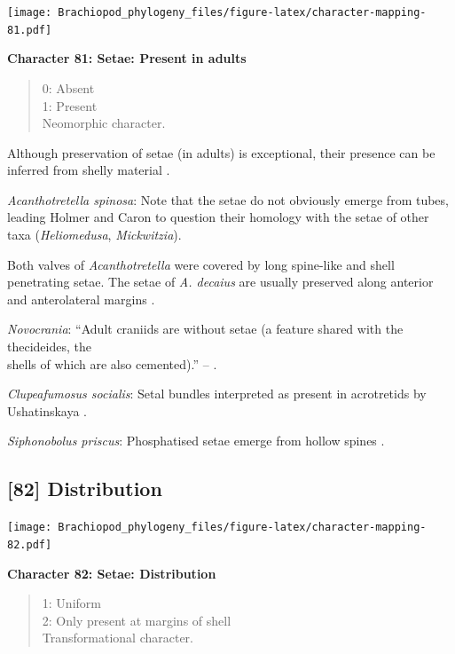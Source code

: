 \documentclass[]{book}
\theoremstyle{definition}
\theoremstyle{definition}
\theoremstyle{definition}
\theoremstyle{remark}
\begin{document}
\texttt{[image: Brachiopod\_phylogeny\_files/figure-latex/character-mapping-81.pdf]}

\textbf{Character 81: Setae: Present in adults}

\begin{quote}
0: Absent\\
1: Present\\
Neomorphic character.
\end{quote}

Although preservation of setae (in adults) is exceptional, their
presence can be inferred from shelly material
\citep[see][]{Holmer2006Aspinose}.

\emph{Acanthotretella spinosa}: Note that the setae do not obviously
emerge from tubes, leading Holmer and Caron to question their homology
with the setae of other taxa (\emph{Heliomedusa}, \emph{Mickwitzia}).

Both valves of \emph{Acanthotretella} were covered by long spine-like
and shell penetrating setae. The setae of \emph{A. decaius} are usually
preserved along anterior and anterolateral margins
\citep{Hu2010Softpart}.

\emph{Novocrania}: ``Adult craniids are without setae (a feature shared
with the thecideides, the\\
shells of which are also cemented).'' -- \citet{Williams2007PartH}.

\emph{Clupeafumosus socialis}: Setal bundles interpreted as present in
acrotretids by Ushatinskaya \citeyearpar{Ushatinskaya2016Protegulumand}.

\emph{Siphonobolus priscus}: Phosphatised setae emerge from hollow
spines \citep{Popov2009Earlyontogeny}.

\hypertarget{distribution}{%
\subsection*{{[}82{]} Distribution}\label{distribution}}

\texttt{[image: Brachiopod\_phylogeny\_files/figure-latex/character-mapping-82.pdf]}

\textbf{Character 82: Setae: Distribution}

\begin{quote}
1: Uniform\\
2: Only present at margins of shell\\
Transformational character.
\end{quote}
\end{document}
